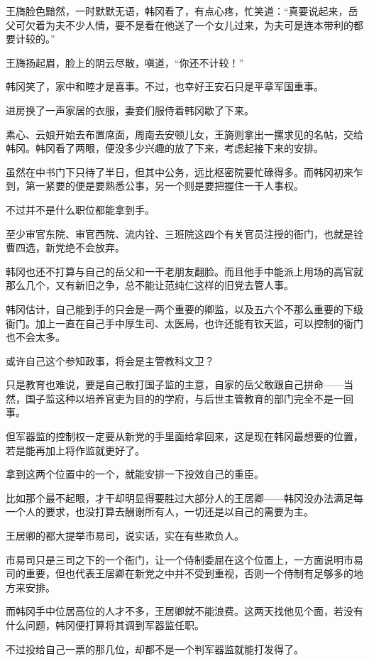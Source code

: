 王旖脸色黯然，一时默默无语，韩冈看了，有点心疼，忙笑道：“真要说起来，岳父可欠着为夫不少人情，要不是看在他送了一个女儿过来，为夫可是连本带利的都要计较的。”

王旖扬起眉，脸上的阴云尽散，嗔道，“你还不计较！”

韩冈笑了，家中和睦才是喜事。不过，也幸好王安石只是平章军国重事。

进房换了一声家居的衣服，妻妾们服侍着韩冈歇了下来。

素心、云娘开始去布置席面，周南去安顿儿女，王旖则拿出一摞求见的名帖，交给韩冈。韩冈看了两眼，便没多少兴趣的放了下来，考虑起接下来的安排。

虽然在中书门下只待了半日，但其中公务，远比枢密院要忙碌得多。而韩冈初来乍到，第一紧要的便是要熟悉公事，另一个则是要把握住一干人事权。

不过并不是什么职位都能拿到手。

至少审官东院、审官西院、流内铨、三班院这四个有关官员注授的衙门，也就是铨曹四选，新党绝不会放弃。

韩冈也还不打算与自己的岳父和一干老朋友翻脸。而且他手中能派上用场的高官就那么几个，又有新旧之争，总不能让范纯仁这样的旧党去管人事。

韩冈估计，自己能到手的只会是一两个重要的卿监，以及五六个不那么重要的下级衙门。加上一直在自己手中厚生司、太医局，也许还能有钦天监，可以控制的衙门也不会太多。

或许自己这个参知政事，将会是主管教科文卫？

只是教育也难说，要是自己敢打国子监的主意，自家的岳父敢跟自己拼命——当然，国子监这种以培养官吏为目的的学府，与后世主管教育的部门完全不是一回事。

但军器监的控制权一定要从新党的手里面给拿回来，这是现在韩冈最想要的位置，若是能再加上将作监就更好了。

拿到这两个位置中的一个，就能安排一下投效自己的重臣。

比如那个最不起眼，才干却明显得要胜过大部分人的王居卿——韩冈没办法满足每一个人的要求，也没打算去酬谢所有人，一切还是以自己的需要为主。

王居卿的都大提举市易司，说实话，实在有些欺负人。

市易司只是三司之下的一个衙门，让一个侍制委屈在这个位置上，一方面说明市易司的重要，但也代表王居卿在新党之中并不受到重视，否则一个侍制有足够多的地方来安排。

而韩冈手中位居高位的人才不多，王居卿就不能浪费。这两天找他见个面，若没有什么问题，韩冈便打算将其调到军器监任职。

不过投给自己一票的那几位，却都不是一个判军器监就能打发得了。

